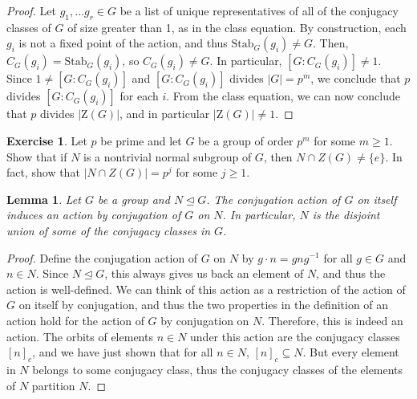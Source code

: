 \documentclass[12pt]{report}
\newtheorem{lemma}[theorem]{Lemma}
\numberwithin{equation}{section}
\numberwithin{theorem}{chapter}
\theoremstyle{definition}
\newtheorem{exercise}{Exercise}
\newtheorem*{basic properties}{Basic Properties}
\newtheorem*{Important Remark}{Important Remark}
\begin{document}
\begin{proof}
Let $g_1,\ldots g_r \in G$ be a list of unique representatives of all of the conjugacy classes of $G$ of size greater than 1, as in the {class equation}. By construction, each $g_i$ is not a fixed point of the action, and thus $\mathrm{Stab}_G(g_i) \neq G$. Then, $C_G(g_i) = \mathrm{Stab}_G(g_i)$, so $C_G(g_i) \neq G$. In particular, $[G:C_G(g_i)]\neq 1$. Since $1\neq [G:C_G(g_i)]$ and $[G:C_G(g_i)]$ divides $|G|=p^m$, we conclude that $p$ divides $[G:C_G(g_i)]$ for each $i$. From the {class equation}, we can now conclude that $p$ divides $|\mathrm{Z}(G)|$, and in particular $|\mathrm{Z}(G)|\neq 1$.
\end{proof}





\begin{exercise}
Let $p$ be prime and let $G$ be a group of order $p^m$ for some $m \geqslant 1$. Show that if $N$ is a nontrivial normal subgroup of $G$, then $N \cap Z(G) \ne \{e\}$. In fact, show that $|N \cap Z(G)| = p^j$ for some $j \geqslant 1$. 
\end{exercise}



\begin{lemma}\label{conjugation descends to normal subgroups}
Let $G$ be a group and $N\trianglelefteq G$. The conjugation action of $G$ on itself induces an action by conjugation of $G$ on $N$. In particular, $N$ is the disjoint union of some of the conjugacy classes in $G$.
\end{lemma}


\begin{proof}
Define the conjugation action of $G$ on $N$ by $g\cdot n=gng^{-1}$ for all $g\in G$ and $n\in N$. Since $N\trianglelefteq G$, this always gives us back an element of $N$, and thus the action is well-defined. We can think of this action as a restriction of the action of $G$ on itself by conjugation, and thus the two properties in the definition of an action hold for the action of $G$ by conjugation on $N$. Therefore, this is indeed an action. The orbits of elements $n\in N$ under this action are the conjugacy classes $[n]_c$, and we have just shown that for all $n \in N$, $[n]_c \subseteq N$. But every element in $N$ belongs to some conjugacy class, thus the conjugacy classes of the elements of $N$ partition $N$.
\end{proof}
\end{document}

